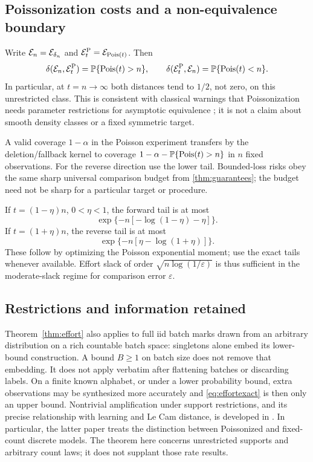 \documentclass[11pt]{article}
\numberwithin{equation}{section}
\theoremstyle{definition}
\theoremstyle{remark}
\begin{document}
\subsection{Poissonization costs and a non-equivalence boundary}
Write $\mathcal E_n=\mathcal E_{\delta_n}$ and $\mathcal E_t^{\rm P}=\mathcal E_{\operatorname{Pois}(t)}$. Then
\begin{equation}\label{eq:poissontails}
 \delta(\mathcal E_n,\mathcal E_t^{\rm P})=\mathbb P\{\operatorname{Pois}(t)>n\},\qquad
 \delta(\mathcal E_t^{\rm P},\mathcal E_n)=\mathbb P\{\operatorname{Pois}(t)<n\}.
\end{equation}
In particular, at $t=n\to\infty$ both distances tend to $1/2$, not zero, on this unrestricted class. This is consistent with classical warnings that Poissonization needs parameter restrictions for asymptotic equivalence \cite{LowZhou2007}; it is not a claim about smooth density classes or a fixed symmetric target.

A valid coverage $1-\alpha$ in the Poisson experiment transfers by the deletion/fallback kernel to coverage $1-\alpha-\mathbb P\{\operatorname{Pois}(t)>n\}$ in $n$ fixed observations. For the reverse direction use the lower tail. Bounded-loss risks obey the same sharp universal comparison budget from \cref{thm:guarantees}; the budget need not be sharp for a particular target or procedure.

If $t=(1-\eta)n$, $0<\eta<1$, the forward tail is at most
\[
 \exp\{-n[-\log(1-\eta)-\eta]\}.
\]
If $t=(1+\eta)n$, the reverse tail is at most
\[
 \exp\{-n[\eta-\log(1+\eta)]\}.
\]
These follow by optimizing the Poisson exponential moment; use the exact tails whenever available. Effort slack of order $\sqrt{n\log(1/\varepsilon)}$ is thus sufficient in the moderate-slack regime for comparison error $\varepsilon$.

\subsection{Restrictions and information retained}
Theorem~\ref{thm:effort} also applies to full iid batch marks drawn from an arbitrary distribution on a rich countable batch space: singletons alone embed its lower-bound construction. A bound $B\ge1$ on batch size does not remove that embedding. It does not apply verbatim after flattening batches or discarding labels. On a finite known alphabet, or under a lower probability bound, extra observations may be synthesized more accurately and \eqref{eq:effortexact} is then only an upper bound. Nontrivial amplification under support restrictions, and its precise relationship with learning and Le Cam distance, is developed in \cite{Axelrod2020,Axelrod2024}. In particular, the latter paper treats the distinction between Poissonized and fixed-count discrete models. The theorem here concerns unrestricted supports and arbitrary count laws; it does not supplant those rate results.
\end{document}
